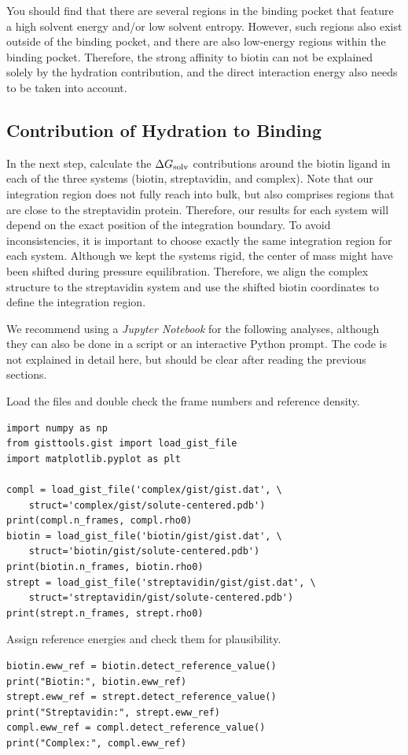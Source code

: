 \documentclass[9pt,tutorial]{livecoms}
\newcommand{\dgsolv}{\Delta G_\textup{solv}}
\newcommand{\software}{\emph}
\begin{document}
You should find that there are several regions in the binding pocket that feature a high solvent energy and/or low solvent entropy.
However, such regions also exist outside of the binding pocket, and there are also low-energy regions within the binding pocket.
Therefore, the strong affinity to biotin can not be explained solely by the hydration contribution, and the direct interaction energy also needs to be taken into account.

\subsection{Contribution of Hydration to Binding}
In the next step, calculate the $\dgsolv$ contributions around the biotin ligand in each of the three systems (biotin, streptavidin, and complex).
Note that our integration region does not fully reach into bulk, but also comprises regions that are close to the streptavidin protein. 
Therefore, our results for each system will depend on the exact position of the integration boundary. 
To avoid inconsistencies, it is important to choose exactly the same integration region for each system.
Although we kept the systems rigid, the center of mass might have been shifted during pressure equilibration.
Therefore, we align the complex structure to the streptavidin system and use the shifted biotin coordinates to define the integration region.

We recommend using a \software{Jupyter Notebook} for the following analyses, although they can also be done in a script or an interactive Python prompt.
The code is not explained in detail here, but should be clear after reading the previous sections.

Load the files and double check the frame numbers and reference density.
\begin{lstlisting}[style=python]
import numpy as np
from gisttools.gist import load_gist_file
import matplotlib.pyplot as plt

compl = load_gist_file('complex/gist/gist.dat', \
    struct='complex/gist/solute-centered.pdb')
print(compl.n_frames, compl.rho0)
biotin = load_gist_file('biotin/gist/gist.dat', \
    struct='biotin/gist/solute-centered.pdb')
print(biotin.n_frames, biotin.rho0)
strept = load_gist_file('streptavidin/gist/gist.dat', \
    struct='streptavidin/gist/solute-centered.pdb')
print(strept.n_frames, strept.rho0)
\end{lstlisting}

Assign reference energies and check them for plausibility.
\begin{lstlisting}[style=python]
biotin.eww_ref = biotin.detect_reference_value()
print("Biotin:", biotin.eww_ref)
strept.eww_ref = strept.detect_reference_value()
print("Streptavidin:", strept.eww_ref)
compl.eww_ref = compl.detect_reference_value()
print("Complex:", compl.eww_ref)
\end{lstlisting}
\end{document}
